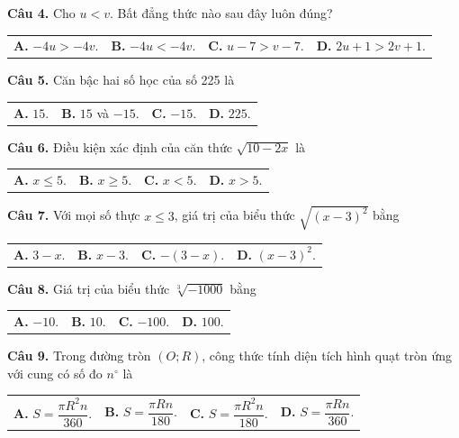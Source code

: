\documentclass[11pt,a4paper]{article}
\begin{document}
\vspace{1.5mm}
\textbf{Câu 4.} Cho $u < v$. Bất đẳng thức nào sau đây luôn đúng?\\
\begin{tabularx}{\linewidth}{XXXX}
\textbf{A.} $-4u > -4v$. & \textbf{B.} $-4u < -4v$. & \textbf{C.} $u - 7 > v - 7$. & \textbf{D.} $2u + 1 > 2v + 1$.
\end{tabularx}

\vspace{1.5mm}
\textbf{Câu 5.} Căn bậc hai số học của số 225 là\\
\begin{tabularx}{\linewidth}{XXXX}
\textbf{A.} $15$. & \textbf{B.} $15$ và $-15$. & \textbf{C.} $-15$. & \textbf{D.} $225$.
\end{tabularx}

\vspace{1.5mm}
\textbf{Câu 6.} Điều kiện xác định của căn thức $\sqrt{10 - 2x}$ là\\
\begin{tabularx}{\linewidth}{XXXX}
\textbf{A.} $x \le 5$. & \textbf{B.} $x \ge 5$. & \textbf{C.} $x < 5$. & \textbf{D.} $x > 5$.
\end{tabularx}

\vspace{1.5mm}
\textbf{Câu 7.} Với mọi số thực $x \le 3$, giá trị của biểu thức $\sqrt{(x-3)^2}$ bằng\\
\begin{tabularx}{\linewidth}{XXXX}
\textbf{A.} $3 - x$. & \textbf{B.} $x - 3$. & \textbf{C.} $-(3-x)$. & \textbf{D.} $(x-3)^2$.
\end{tabularx}

\vspace{1.5mm}
\textbf{Câu 8.} Giá trị của biểu thức $\sqrt[3]{-1000}$ bằng\\
\begin{tabularx}{\linewidth}{XXXX}
\textbf{A.} $-10$. & \textbf{B.} $10$. & \textbf{C.} $-100$. & \textbf{D.} $100$.
\end{tabularx}

\vspace{1.5mm}
\textbf{Câu 9.} Trong đường tròn $(O; R)$, công thức tính diện tích hình quạt tròn ứng với cung có số đo $n^\circ$ là\\
\begin{tabularx}{\linewidth}{XXXX}
\textbf{A.} $S = \dfrac{\pi R^2 n}{360}$. & \textbf{B.} $S = \dfrac{\pi R n}{180}$. & \textbf{C.} $S = \dfrac{\pi R^2 n}{180}$. & \textbf{D.} $S = \dfrac{\pi R n}{360}$.
\end{tabularx}
\end{document}
